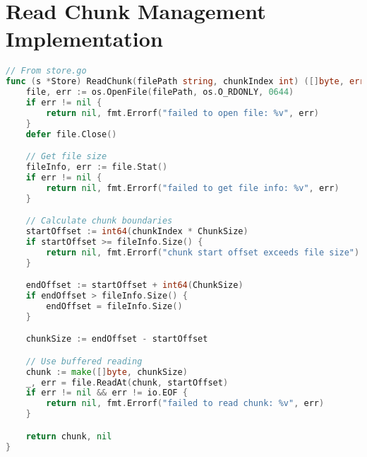 \documentclass[12pt,a4paper]{report}
\begin{document}
\section{Read Chunk Management Implementation}
\begin{lstlisting}[language=Go, caption={ReadChunk Code}, label={lst:read-chunk}]
// From store.go
func (s *Store) ReadChunk(filePath string, chunkIndex int) ([]byte, error) {
    file, err := os.OpenFile(filePath, os.O_RDONLY, 0644)
    if err != nil {
        return nil, fmt.Errorf("failed to open file: %v", err)
    }
    defer file.Close()

    // Get file size
    fileInfo, err := file.Stat()
    if err != nil {
        return nil, fmt.Errorf("failed to get file info: %v", err)
    }

    // Calculate chunk boundaries
    startOffset := int64(chunkIndex * ChunkSize)
    if startOffset >= fileInfo.Size() {
        return nil, fmt.Errorf("chunk start offset exceeds file size")
    }

    endOffset := startOffset + int64(ChunkSize)
    if endOffset > fileInfo.Size() {
        endOffset = fileInfo.Size()
    }

    chunkSize := endOffset - startOffset

    // Use buffered reading
    chunk := make([]byte, chunkSize)
    _, err = file.ReadAt(chunk, startOffset)
    if err != nil && err != io.EOF {
        return nil, fmt.Errorf("failed to read chunk: %v", err)
    }

    return chunk, nil
}
\end{lstlisting}
\end{document}

